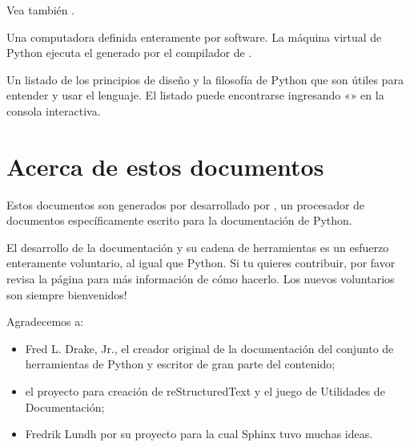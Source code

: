 \documentclass[a4,10pt,spanish]{sphinxmanual}
\begin{document}
\begin{description}
\sphinxAtStartPar
Vea también .

\item[{máquina virtual\index{máquina virtual@\spxentry{máquina virtual}|spxpagem}\phantomsection\label{\detokenize{glossary:term-virtual-machine}}}] \leavevmode
\sphinxAtStartPar
Una computadora definida enteramente por software.  La máquina virtual de Python ejecuta el {\hyperref[\detokenize{glossary:term-bytecode}]{}} generado por el compilador de .

\item[{Zen de Python\index{Zen de Python@\spxentry{Zen de Python}|spxpagem}\phantomsection\label{\detokenize{glossary:term-Zen-of-Python}}}] \leavevmode
\sphinxAtStartPar
Un listado de los principios de diseño y la filosofía de Python que son útiles para entender y usar el lenguaje.  El listado puede encontrarse ingresando  «» en la consola interactiva.

\end{description}
\label{\detokenize{about::doc}}

\chapter{Acerca de estos documentos}
\label{\detokenize{about:about-these-documents}}
\sphinxAtStartPar
Estos documentos son generados por  desarrollado por , un procesador de documentos específicamente escrito para la documentación de Python.

\sphinxAtStartPar
El desarrollo de la documentación y su cadena de herramientas es un esfuerzo enteramente voluntario, al igual que Python. Si tu quieres contribuir, por favor revisa la página  para más información de cómo hacerlo. Los nuevos voluntarios son siempre bienvenidos!

\sphinxAtStartPar
Agradecemos a:
\begin{itemize}
\item {} 
\sphinxAtStartPar
Fred L. Drake, Jr., el creador original de la documentación del conjunto de herramientas de Python y escritor de gran parte del contenido;

\item {} 
\sphinxAtStartPar
el proyecto  para creación de reStructuredText y el juego de Utilidades de Documentación;

\item {} 
\sphinxAtStartPar
Fredrik Lundh por su proyecto  para la cual Sphinx tuvo muchas ideas.

\end{itemize}
\end{document}
